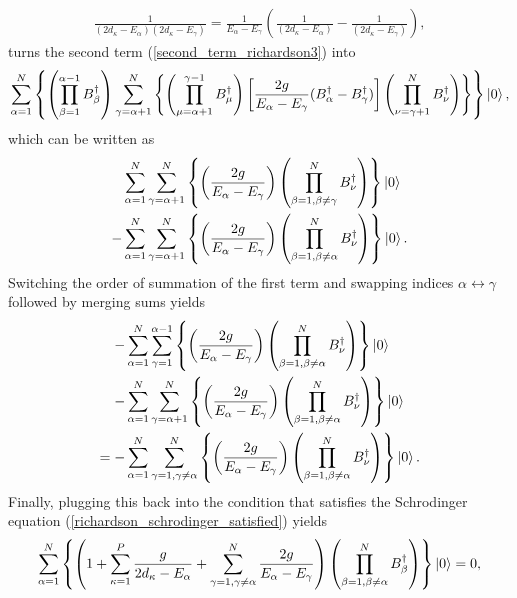 \documentclass[Dual]{msu-thesis}
\begin{document}
\begin{align}
\frac{1}{(2d_\kappa-E_\alpha)(2d_\kappa-E_\gamma)}
=
\frac{1}{E_\alpha-E_\gamma}
\left(
\frac{1}{(2d_\kappa-E_\alpha)}
-
\frac{1}{(2d_\kappa-E_\gamma)}
\right)
,\end{align}
turns the second term (\ref{second_term_richardson3}) into
\begin{align}
\label{second_term_richardson2}
\sum_{\alpha=1}^N
\left\{
\left(\prod_{\beta=1}^{\alpha-1}B^\dagger_\beta\right)
\sum_{\gamma=\alpha+1}^N
\left\{
\left(\prod_{\mu=\alpha+1}^{\gamma-1} B^\dagger_\mu\right)
\left[
\frac{2g}{E_\alpha-E_\gamma}(B^\dagger_\alpha-B^\dagger_\gamma)
\right]
\left(\prod_{\nu=\gamma+1}^NB^\dagger_\nu\right)
\right\}
\right\}
\ket{0}
,\end{align}
which can be written as
\begin{align}
&\sum_{\alpha=1}^N
\sum_{\gamma=\alpha+1}^N
\left\{
\left(
\frac{2g}{E_\alpha-E_\gamma}
\right)
\left(\prod_{\beta=1,\beta\neq\gamma}^NB^\dagger_\nu\right)
\right\}
\ket{0}
\nonumber
\\
-&
\sum_{\alpha=1}^N
\sum_{\gamma=\alpha+1}^N
\left\{
\left(
\frac{2g}{E_\alpha-E_\gamma}
\right)
\left(\prod_{\beta=1,\beta\neq\alpha}^NB^\dagger_\nu\right)
\right\}
\ket{0}
.\end{align}
Switching the order of summation of the first term and swapping indices $\alpha\leftrightarrow\gamma$ followed by merging sums yields
\begin{align}
-&
\sum_{\alpha=1}^N
\sum_{\gamma=1}^{\alpha-1}
\left\{
\left(
\frac{2g}{E_\alpha-E_\gamma}
\right)
\left(\prod_{\beta=1,\beta\neq\alpha}^NB^\dagger_\nu\right)
\right\}
\ket{0}
\nonumber
\\
-&
\sum_{\alpha=1}^N
\sum_{\gamma=\alpha+1}^N
\left\{
\left(
\frac{2g}{E_\alpha-E_\gamma}
\right)
\left(\prod_{\beta=1,\beta\neq\alpha}^NB^\dagger_\nu\right)
\right\}
\ket{0}
\\
=-&
\sum_{\alpha=1}^N
\sum_{\gamma=1,\gamma\neq\alpha}^N
\left\{
\left(
\frac{2g}{E_\alpha-E_\gamma}
\right)
\left(\prod_{\beta=1,\beta\neq\alpha}^NB^\dagger_\nu\right)
\right\}
\ket{0}
.\end{align}
Finally, plugging this back into the condition that satisfies the Schrodinger equation (\ref{richardson_schrodinger_satisfied}) yields
\begin{align}
\sum_{\alpha=1}^N
\left\{
\left(
1
+
\sum_{\kappa=1}^P
\frac{g}{2d_\kappa-E_\alpha}
+
\sum_{\gamma=1,\gamma\neq\alpha}^N
\frac{2g}{E_\alpha-E_\gamma}
\right)
\left(
\prod_{\beta=1,\beta\neq\alpha}^NB^\dagger_\beta
\right)
\right\}
\ket{0}
=0
,\end{align}
\end{document}
